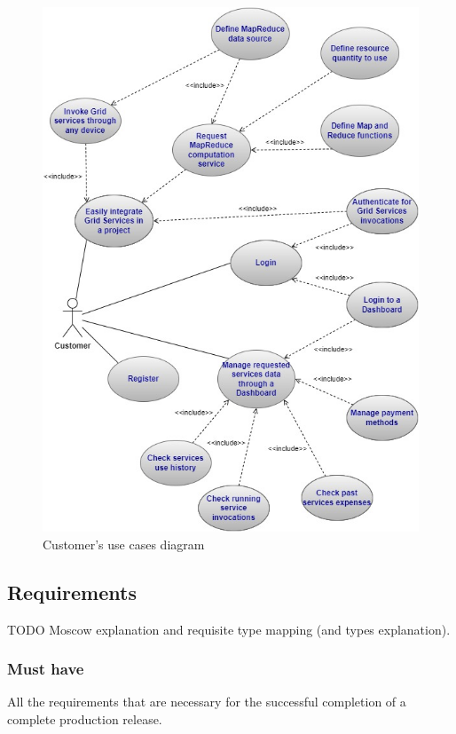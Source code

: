 \begin{figure}[!ht]
    \centering
    \includegraphics[width=\linewidth]{document/chapters/chapter_5/images/customer_use_cases.jpg}
    \caption{Customer's use cases diagram}
    \label{fig:use_cases_customer}
\end{figure}

\subsection{Requirements}
TODO Moscow explanation and requisite type mapping (and types explanation).

\subsubsection{Must have}
All the requirements that are necessary for the successful completion of a complete production release.

